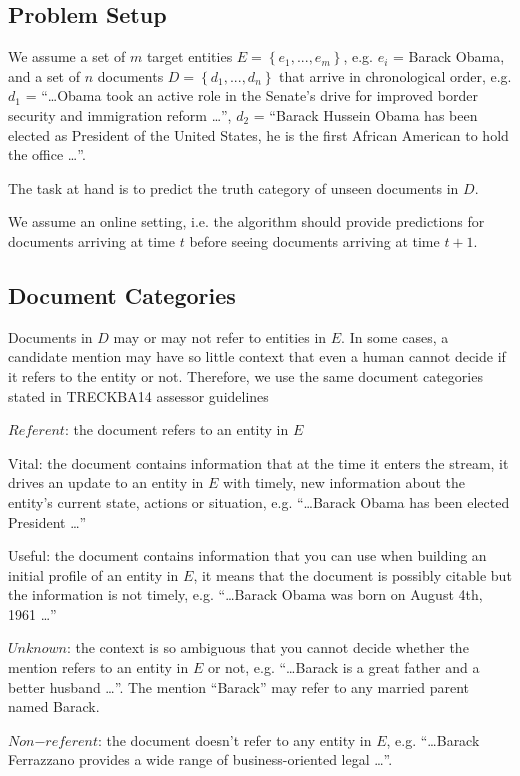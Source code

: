 \documentclass{article}
\begin{document}
\subsection{Problem Setup}
\label{setup}

We assume a set of $m$ target entities $E = \left\{ {e_1, ..., e_m}\right\}$, e.g. $e_i$ = Barack Obama, and a set of $n$ documents $D = \left\{ {d_1, ..., d_n}\right\}$ that arrive in chronological order, e.g. $d_1$ = ``\dots Obama took an active role in the Senate's drive for improved border security and immigration reform \dots'', $d_2$ = ``Barack Hussein Obama has been elected as President of the United States, he is the first African American to hold the office \dots''.

The task at hand is to predict the truth category of unseen documents in $D$.

We assume an online setting, i.e. the algorithm should provide predictions for documents arriving at time $t$ before seeing documents arriving at time $t+1$.

\subsection{Document Categories}
\label{categories}

Documents in $D$ may or may not refer to entities in $E$. In some cases, a candidate mention may have so little context that even a human cannot decide if it refers to the entity or not. Therefore, we use the same document categories stated in TRECKBA14 assessor guidelines

\begin{itemize*}
  \item $Referent$: the document refers to an entity in $E$
    \begin{itemize*}
      \item Vital: the document contains information that at the time it enters the stream, it drives an update to an entity in $E$ with timely, new information about the entity's current state, actions or situation, e.g. ``\dots Barack Obama has been elected President \dots''
      \item Useful: the document contains information that you can use when building an initial profile of an entity in $E$, it means that the document is possibly citable but the information is not timely, e.g. ``\dots Barack Obama was born on August 4th, 1961 \dots''
    \end{itemize*}
  \item $Unknown$: the context is so ambiguous that you cannot decide whether the mention refers to an entity in $E$ or not, e.g. ``\dots Barack is a great father and a better husband \dots''. The mention ``Barack'' may refer to any married parent named Barack.
  \item $Non\mathord{-}referent$: the document doesn't refer to any entity in $E$, e.g. ``\dots Barack Ferrazzano provides a wide range of business-oriented legal \dots''.
\end{itemize*}
\end{document}
